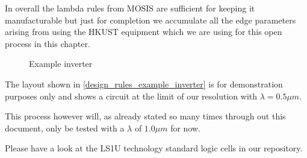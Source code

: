 In overall the lambda rules from MOSIS are sufficient for keeping it manufacturable but just for completion we accumulate all the edge parameters arising from using the HKUST equipment which we are using for this open process in this chapter.

\begin{figure}[H]
	\centering
	\begin{tikzpicture}[node distance =1cm, auto, thick,scale=0.5, every node/.style={transform shape}]
		
	\end{tikzpicture}
	\caption{Example inverter}
	\label{design_rules_example_inverter}
\end{figure}

The layout shown in \autoref{design_rules_example_inverter} is for demonstration purposes only and shows a circuit at the limit of our resolution with $\lambda = 0.5 \mu m$.

This process however will, as already stated so many times through out this document, only be tested with a $\lambda$ of $1.0 \mu m$ for now.

Please have a look at the LS1U technology standard logic cells in our repository.